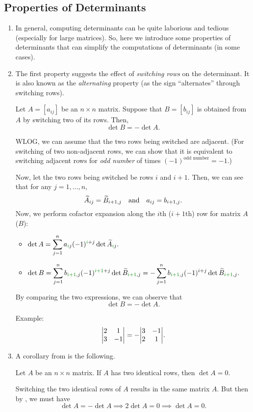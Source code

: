 \subsection{Properties of Determinants}
\label{subsect:det-prop}
\begin{enumerate}
\item In general, computing determinants can be quite laborious and tedious
(especially for large matrices). So, here we introduce some properties of
determinants that can simplify the computations of determinants (in some
cases).

\item The first property suggests the effect of \emph{switching rows} on the
determinant. It is also known as the \emph{alternating} property (as the sign
``alternates'' through switching rows).
\begin{proposition}[Alternating]
\label{prp:det-alter}
Let \(A=[a_{ij}]\) be an \(n\times  n\) matrix. Suppose that \(B=[b_{ij}]\) is obtained from
\(A\) by switching two of its rows. Then,
\[
\det B=-\det A.
\]
\end{proposition}
\begin{pf}
WLOG, we can assume that the two rows being switched are adjacent. (For
switching of two non-adjacent rows, we can show that it is equivalent to
switching adjacent rows for \emph{odd number} of times 
\((-1)^{\text{odd number}}=-1\).)

Now, let the two rows being switched be rows \(i\) and \(i+1\). Then, we can
see that for any \(j=1,\dotsc,n\),
\[
\widetilde{A}_{ij}=\widetilde{B}_{i+1,j}
\qqtext{and}
a_{ij}=b_{i+1,j}.
\]
Now, we perform cofactor expansion along the \(i\)th (\(i+1\)th) row for matrix
\(A\) (\(B\)):
\begin{itemize}
\item \(\displaystyle 
\det A
=\sum_{j=1}^{n}a_{\gc{i}j}(-1)^{\gc{i}+j}\det \widetilde{A}_{\gc{i}j}.
\)
\item \(\displaystyle 
\det B
=\sum_{j=1}^{n}b_{\gc{i+1},j}(-1)^{\gc{i+1}+j}\det \widetilde{B}_{\gc{i+1},j}
=-\sum_{j=1}^{n}b_{\gc{i+1},j}(-1)^{i+j}\det \widetilde{B}_{\gc{i+1},j}.
\)
\end{itemize}
By comparing the two expressions, we can observe that
\[
\det B=-\det A.
\]
\end{pf}

Example:
\[
\mqty|2&1\\3&-1|
=-\mqty|3&-1\\2&1|.
\]
\item A corollary from  is the following.
\begin{corollary}
\label{cor:two-identical-rows-zero-det}
Let \(A\) be an \(n\times  n\) matrix. If \(A\) has two identical rows, then
\(\det A=0\).
\end{corollary}
\begin{pf}
Switching the two identical rows of \(A\) results in the same matrix \(A\). But
then by , we must have
\[
\det A=-\det A\implies 2\det A=0\implies \det A=0.
\]
\end{pf}


\end{enumerate}
